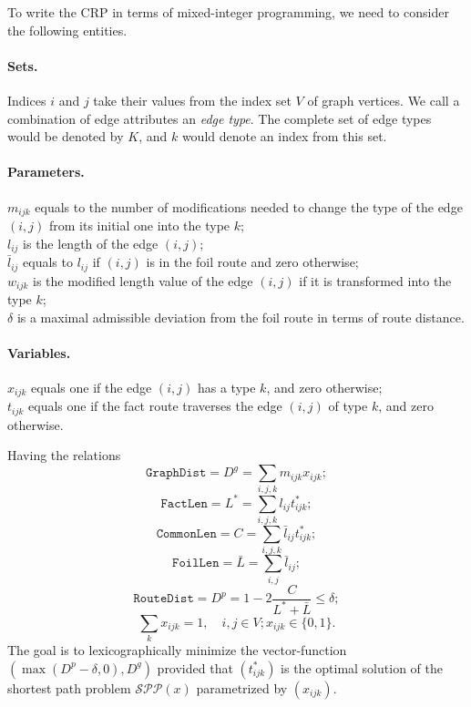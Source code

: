 \documentclass{article}
\begin{document}
To write the CRP in terms of mixed-integer programming, we need to consider the following entities.

\paragraph{Sets.} Indices $i$ and $j$ take their values from the index set $V$ of graph vertices.
We call a combination of edge attributes an \textit{edge type}. 
The complete set of edge types would be denoted by $K$, and $k$ would denote an index from this set.
\paragraph{Parameters.} $m_{ijk}$ equals to the number of modifications needed to change the type of the edge $(i, j)$ from its initial one into the type $k$;\\
$l_{ij}$ is the length of the edge $(i, j)$;\\
$\bar{l}_{ij}$ equals to $l_{ij}$ if $(i, j)$ is in the foil route and zero otherwise;\\
$w_{ijk}$ is the modified length value of the edge $(i, j)$ if it is transformed into the type $k$;\\
$\delta$ is a maximal admissible deviation from the foil route in terms of route distance.
\paragraph{Variables.}
$x_{ijk}$ equals one if the edge $(i, j)$ has a type $k$, and zero otherwise;\\
$t_{ijk}$ equals one if the fact route traverses the edge $(i, j)$ of type $k$, and zero otherwise.

Having the relations
\begin{equation}
\label{eq:1}
	\mathtt{GraphDist} = D^g = \sum_{i, j, k} m_{ijk} x_{ijk};
\end{equation}
\begin{equation}
\label{eq:2}
	\mathtt{FactLen} = L^* = \sum_{i, j, k} l_{ij}t^*_{ijk};
\end{equation}
\begin{equation}
\label{eq:3}
    \mathtt{CommonLen} = C = \sum_{i, j, k} \bar{l}_{ij} t^*_{ijk};
\end{equation}
\begin{equation}
\label{eq:4}
	\mathtt{FoilLen} = \bar{L} = \sum_{i, j} \bar{l}_{ij};
\end{equation}
\begin{equation}
\label{eq:5}
	\mathtt{RouteDist} = D^p = 1 - 2\frac{C}{L^* + \bar{L}} \leq \delta;
\end{equation}
\begin{equation}
\label{eq:6}
	\sum_k x_{ijk} = 1,\quad i, j\in V;
	x_{ijk}\in \{0, 1\}.
\end{equation}
The goal is to lexicographically minimize the vector-function $(\max(D^p - \delta, 0), D^g)$ provided that $(t^*_{ijk})$ is the optimal solution of the shortest path problem $\mathcal{SPP}(x)$ parametrized by $(x_{ijk})$.
\end{document}
